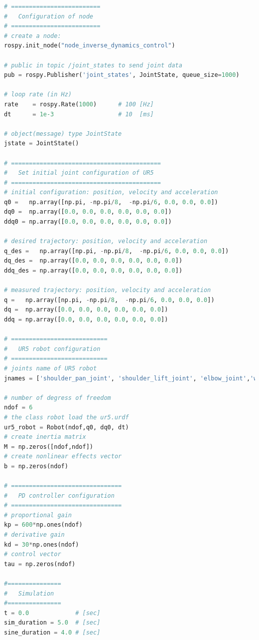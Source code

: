 \begin{lstlisting}[language=Python,caption={Move the second and fifth joint of UR5 robot with the required movement of activity 2.1.}, label={lst:inverse_dynamics_control}]
# =========================
#   Configuration of node
# =========================
# create a node: 
rospy.init_node("node_inverse_dynamics_control")

# public in topic /joint_states	to send joint data	
pub = rospy.Publisher('joint_states', JointState, queue_size=1000)

# loop rate (in Hz)
rate 	= rospy.Rate(1000)		# 100 [Hz]
dt 		= 1e-3					# 10  [ms]

# object(message) type JointState
jstate = JointState()

# ==========================================
#   Set initial joint configuration of UR5
# ==========================================
# initial configuration: position, velocity and acceleration 
q0 =   np.array([np.pi, -np.pi/8,  -np.pi/6, 0.0, 0.0, 0.0])
dq0 =  np.array([0.0, 0.0, 0.0, 0.0, 0.0, 0.0]) 
ddq0 = np.array([0.0, 0.0, 0.0, 0.0, 0.0, 0.0]) 

# desired trajectory: position, velocity and acceleration
q_des =   np.array([np.pi, -np.pi/8,  -np.pi/6, 0.0, 0.0, 0.0]) 
dq_des =  np.array([0.0, 0.0, 0.0, 0.0, 0.0, 0.0]) 
ddq_des = np.array([0.0, 0.0, 0.0, 0.0, 0.0, 0.0]) 

# measured trajectory: position, velocity and acceleration
q =   np.array([np.pi, -np.pi/8,  -np.pi/6, 0.0, 0.0, 0.0])
dq =  np.array([0.0, 0.0, 0.0, 0.0, 0.0, 0.0]) 
ddq = np.array([0.0, 0.0, 0.0, 0.0, 0.0, 0.0]) 

# ===========================
#   UR5 robot configuration
# ===========================
# joints name of UR5 robot
jnames = ['shoulder_pan_joint', 'shoulder_lift_joint', 'elbow_joint','wrist_1_joint', 'wrist_2_joint', 'wrist_3_joint']

# number of degress of freedom
ndof = 6
# the class robot load the ur5.urdf
ur5_robot = Robot(ndof,q0, dq0, dt)
# create inertia matrix 
M = np.zeros([ndof,ndof])
# create nonlinear effects vector
b = np.zeros(ndof)

# ===============================
#   PD controller configuration
# ===============================
# proportional gain
kp = 600*np.ones(ndof)
# derivative gain
kd = 30*np.ones(ndof)
# control vector
tau = np.zeros(ndof)    

#===============
#   Simulation
#===============
t = 0.0             # [sec] 
sim_duration = 5.0  # [sec]
sine_duration = 4.0 # [sec]


\end{lstlisting}
